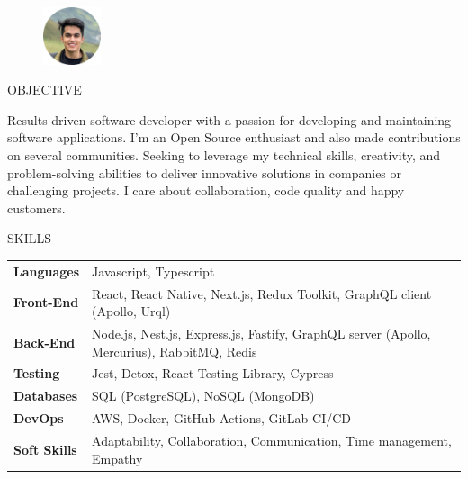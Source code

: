 \documentclass{resume} %
\begin{document}
\begin{figure}[t!]
    \centering
    \includegraphics[width=0.15\textwidth]{figs/profile-photo.png}
    \label{fig:my_label}
\end{figure}


\begin{rSection}{OBJECTIVE}

{Results-driven software developer with a passion for developing and maintaining software applications. I'm an Open Source enthusiast and also made contributions on several communities. Seeking to leverage my technical skills, creativity, and problem-solving abilities to deliver innovative solutions in companies or challenging projects. I care about collaboration, code quality and happy customers. }


\end{rSection}

\begin{rSection}{SKILLS}

\begin{tabular}{ @{} >{\bfseries}l @{\hspace{6ex}} l }
Languages & Javascript, Typescript\\
Front-End & React, React Native, Next.js, Redux Toolkit, GraphQL client (Apollo, Urql)\\
Back-End & Node.js, Nest.js, Express.js, Fastify, GraphQL server (Apollo, Mercurius), RabbitMQ, Redis\\
Testing & Jest, Detox, React Testing Library, Cypress\\
Databases & SQL (PostgreSQL), NoSQL (MongoDB)\\
DevOps & AWS, Docker, GitHub Actions, GitLab CI/CD\\
Soft Skills & Adaptability, Collaboration, Communication, Time management, Empathy\\
\end{tabular}\\
\end{rSection}
\end{document}
